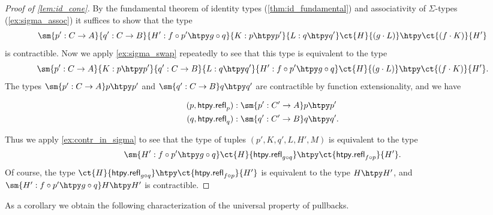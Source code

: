 \begin{proof}[Proof of \cref{lem:id_cone}]
By the fundamental theorem of identity types (\cref{thm:id_fundamental}) and associativity of $\Sigma$-types (\cref{ex:sigma_assoc}) it suffices to show that the type
\begin{equation*}
\sm{p':C\to A}{q':C\to B}{H':f\circ p'\htpy g\circ q}{K:p\htpy p'}{L:q\htpy q'} \ct{H}{(g\cdot L)} \htpy \ct{(f\cdot K)}{H'}
\end{equation*}
is contractible. Now we apply \cref{ex:sigma_swap} repeatedly to see that this type is equivalent to the type
\begin{equation*}
\sm{p':C\to A}{K: p\htpy p'}{q':C\to B}{L: q\htpy q'}{H':f\circ p'\htpy g\circ q} \ct{H}{(g\cdot L)} \htpy \ct{(f\cdot K)}{H'}.
\end{equation*}
The types $\sm{p':C\to A} p\htpy p'$ and $\sm{q':C\to B} q\htpy q'$ are contractible by function extensionality, and  we have
\begin{samepage}
\begin{align*}
(p,\mathsf{htpy.refl}_p) & : \sm{p':C'\to A} p\htpy p' \\
(q,\mathsf{htpy.refl}_q) & : \sm{q':C'\to B} q\htpy q'.
\end{align*}%
\end{samepage}%
Thus we apply \cref{ex:contr_in_sigma} to see that the type of tuples $(p',K,q',L,H',M)$ is equivalent to the type
\begin{equation*}
\sm{H':f\circ p'\htpy g\circ q} \ct{H}{\mathsf{htpy.refl}_{g\circ q}}\htpy \ct{\mathsf{htpy.refl}_{f\circ p}}{H'}.
\end{equation*}
Of course, the type $\ct{H}{\mathsf{htpy.refl}_{g\circ q}}\htpy \ct{\mathsf{htpy.refl}_{f\circ p}}{H'}$ is equivalent to the type $H\htpy H'$, and $\sm{H':f\circ p'\htpy g\circ q} H\htpy H'$ is contractible.
\end{proof}

As a corollary we obtain the following characterization of the universal property of pullbacks.


